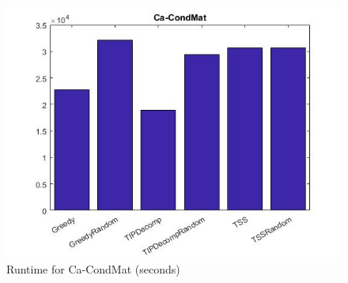 \begin{figure}
	\centering	
	\includegraphics[scale=0.5]{images/condmathtime.jpg}
	\caption{Runtime for Ca-CondMat (seconds)}
\end{figure}

